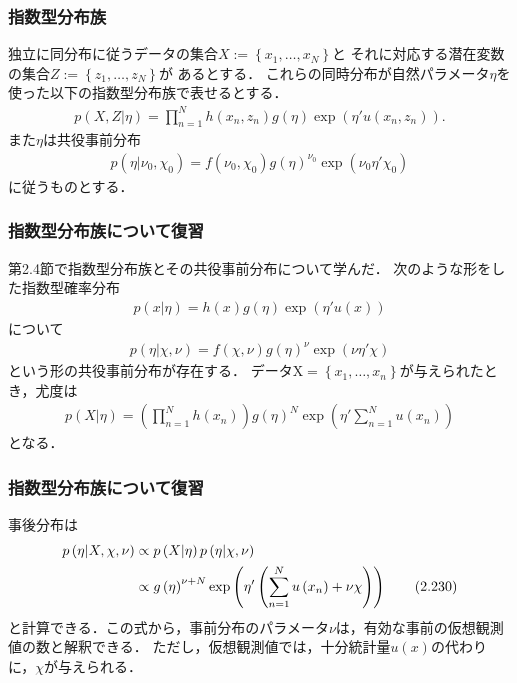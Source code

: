 \documentclass[10pt,usepdftitle=false,hyperref={unicode}]{beamer}
\newcommand{\parentheses}[1]{\left(#1\right)}
\newcommand{\braces}[1]{\left\{#1\right\}}
\begin{document}
\begin{frame}
\frametitle{指数型分布族}
独立に同分布に従うデータの集合$X := \braces{x_1,\ldots,x_N}$と
それに対応する潜在変数の集合$Z := \braces{z_1,\ldots,z_N}$が
あるとする．
これらの同時分布が自然パラメータ$\eta$を
使った以下の指数型分布族で表せるとする．
\begin{align*}
    p\parentheses{X,Z|\eta} = \prod_{n = 1}^N h\parentheses{x_n,z_n}g\parentheses{\eta}\exp\parentheses{\eta'u\parentheses{x_n,z_n}}. \tag{10.113}
\end{align*}
また$\eta$は共役事前分布
\begin{align*}
    p\parentheses{\eta|\nu_0,\chi_0} = f\parentheses{\nu_0,\chi_0}g\parentheses{\eta}^{\nu_0}\exp\parentheses{\nu_0\eta'\chi_0}
\end{align*}
に従うものとする．
\end{frame}

\begin{frame}
\frametitle{指数型分布族について復習}
第2.4節で指数型分布族とその共役事前分布について学んだ．
次のような形をした指数型確率分布
\begin{align}
    p\parentheses{x|\eta}
    = h\parentheses{x}g\parentheses{\eta}\exp\parentheses{\eta'u\parentheses{x}} \tag{2.194}
\end{align}
について
\begin{align}
    p\parentheses{\eta | \chi, \nu}
    = f\parentheses{\chi, \nu} g\parentheses{\eta}^\nu \exp \parentheses{\nu \eta' \chi} \tag{2.229}
\end{align}
という形の共役事前分布が存在する．
データ$\mathrm{X} = \braces{x_1,\ldots,x_n}$が与えられたとき，尤度は
\begin{align}
    p\parentheses{X|\eta}
    = \parentheses{\prod_{n = 1}^N h\parentheses{x_n}} g\parentheses{\eta}^N \exp\parentheses{\eta'\sum_{n = 1}^N u\parentheses{x_n}} \tag{2.227}
\end{align}
となる．
\end{frame}

\begin{frame}
\frametitle{指数型分布族について復習}
事後分布は
\begin{align}
    p\parentheses{\eta | X,\chi,\nu}
    & \propto p\parentheses{X | \eta} p\parentheses{\eta| \chi, \nu} \notag \\
    & \propto g\parentheses{\eta}^{\nu + N} \exp \parentheses{\eta' \parentheses{\sum_{n =1}^N u\parentheses{x_n} + \nu \chi}} \tag{2.230}
\end{align}
と計算できる．この式から，事前分布のパラメータ$\nu$は，有効な事前の仮想観測値の数と解釈できる．
ただし，仮想観測値では，十分統計量$u\parentheses{x}$の代わりに，$\chi$が与えられる．
\end{frame}
\end{document}
